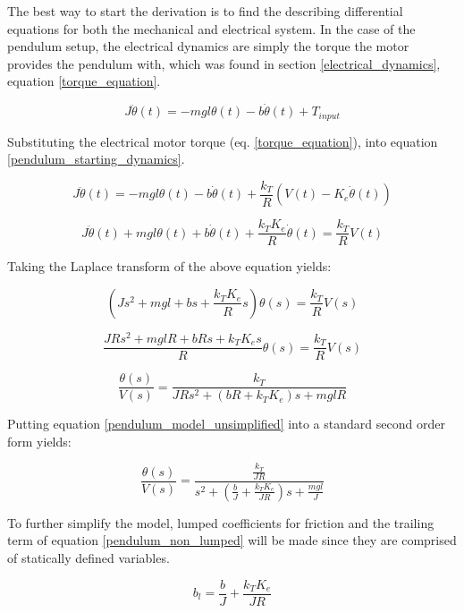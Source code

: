 The best way to start the derivation is to find the describing differential equations for both the mechanical and electrical system. In the case of the pendulum setup, the electrical dynamics are simply the torque the motor provides the pendulum with, which was found in section \ref{electrical_dynamics}, equation \ref{torque_equation}.

\begin{equation}
\label{pendulum_starting_dynamics}
J \ddot{\theta}(t) = -mgl\theta(t) - b\dot{\theta}(t) + T_{input}
\end{equation}

Substituting the electrical motor torque (eq. \ref{torque_equation}), into equation \ref{pendulum_starting_dynamics}.

\begin{equation}
J \ddot{\theta}(t) = -mgl\theta(t) - b\dot{\theta}(t) + \frac{k_T}{R}(V(t)-K_e \dot{\theta}(t))
\end{equation}

\[J \ddot{\theta}(t) + mgl\theta(t) + b\dot{\theta}(t) + \frac{k_T K_e}{R}\dot{\theta}(t)= \frac{k_T}{R}V(t)\]

Taking the Laplace transform of the above equation yields:

\[(Js^2 + mgl + bs + \frac{k_T K_e}{R}s)\theta(s) = \frac{k_T}{R}V(s)  \]

\[\frac{JRs^2 + mglR + bRs + k_T K_es}{R}\theta(s) = \frac{k_T}{R}V(s) \]

\begin{equation}
\label{pendulum_model_unsimplified}
\frac{\theta(s)}{V(s)} = \frac{k_T}{JRs^2 + (bR + k_T K_e)s + mglR}
\end{equation}

Putting equation \ref{pendulum_model_unsimplified} into a standard second order form yields:

\begin{equation}
\label{pendulum_non_lumped}
\frac{\theta(s)}{V(s)} = \frac{\frac{k_T}{JR}}{s^2 + (\frac{b}{J} + \frac{k_T K_e}{JR})s + \frac{mgl}{J}}
\end{equation}

To further simplify the model, lumped coefficients for friction and the trailing term of equation \ref{pendulum_non_lumped} will be made since they are comprised of statically defined variables.

\begin{equation}
\label{lumped_friction}
b_l = \frac{b}{J} + \frac{k_T K_e}{JR}
\end{equation}

